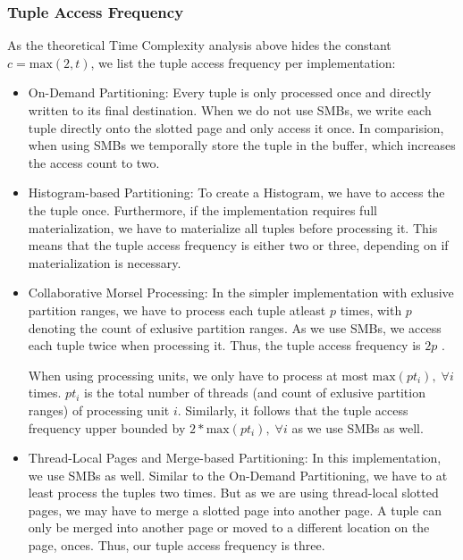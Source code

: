 \subsubsection{Tuple Access Frequency}
As the theoretical Time Complexity analysis above hides the constant $c = \textrm{max}(2, t)$, we list the tuple access frequency per implementation:
\begin{itemize}
  \item On-Demand Partitioning: Every tuple is only processed once and directly written to its final destination.
        When we do not use \acp{SMB}, we write each tuple directly onto the slotted page and only access it once.
        In comparision, when using \acp{SMB} we temporally store the tuple in the buffer, which increases the access count to two.
  \item Histogram-based Partitioning: To create a Histogram, we have to access the the tuple once.
        Furthermore, if the implementation requires full materialization, we have to materialize all tuples before processing it.
        This means that the tuple access frequency is either two or three, depending on if materialization is necessary.

  \item Collaborative Morsel Processing: In the simpler implementation with exlusive partition ranges, we have to process each tuple atleast $p$ times, with $p$ denoting the count of exlusive partition ranges.
        As we use \acp{SMB}, we access each tuple twice when processing it.
        Thus, the tuple access frequency is $2p$ .

        When using processing units, we only have to process at most $\textrm{max}(pt_i), \; \forall i$ times.
        $pt_i$ is the total number of threads (and count of exlusive partition ranges) of processing unit $i$.
        Similarly, it follows that the tuple access frequency upper bounded by $2 * \textrm{max}(pt_i), \; \forall i$ as we use \acp{SMB} as well.

  \item Thread-Local Pages and Merge-based Partitioning: In this implementation, we use \acp{SMB} as well.
        Similar to the On-Demand Partitioning, we have to at least process the tuples two times.
        But as we are using thread-local slotted pages, we may have to merge a slotted page into another page.
        A tuple can only be merged into another page or moved to a different location on the page, onces.
        Thus, our tuple access frequency is three.
\end{itemize}
